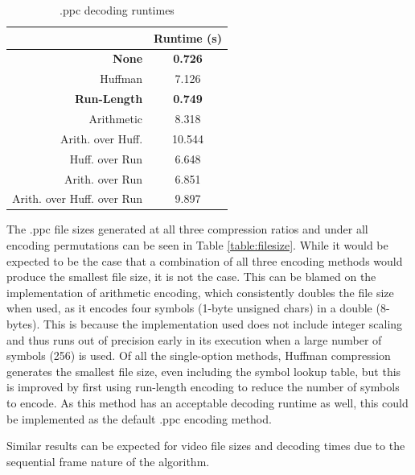 \documentclass[10pt,twocolumn,twoside]{IEEEtran}
\begin{document}
\begin{table}[htdp]
\caption{.ppc decoding runtimes}
\vskip -15pt
\label{table:decode_times}
\small{
\begin{center}
\begin{tabular}{|r|c|}
\hline
 & Runtime (s) \\
 \hline
 \textbf{None} & \textbf{0.726}\\
 \hline
 Huffman & 7.126\\
 \hline
 \textbf{Run-Length} & \textbf{0.749}\\
 \hline
 Arithmetic & 8.318\\
 \hline
 Arith. over Huff. & 10.544\\
 \hline
 Huff. over Run & 6.648\\
 \hline
 Arith. over Run & 6.851\\
 \hline
 Arith. over Huff. over Run & 9.897\\
 \hline
\end{tabular}
\end{center}
}
\end{table}

The .ppc file sizes generated at all three compression ratios and under all encoding permutations can be seen 
in Table \ref{table:filesize}. While it would be expected to be the case that a combination of all three 
encoding methods would produce the smallest file size, it is not the case. This can be blamed on the 
implementation of arithmetic encoding, which consistently doubles the file size when used, as it encodes four 
symbols (1-byte unsigned chars) in a double (8-bytes). This is because the implementation used does not 
include integer scaling and thus runs out of precision early in its execution when a large number of symbols 
(256) is used. Of all the single-option methods, Huffman compression generates the smallest file size, even 
including the symbol lookup table, but this is improved by first using run-length encoding to reduce the 
number of symbols to encode. As this method has an acceptable decoding runtime as well, this could be 
implemented as the default .ppc encoding method.

Similar results can be expected for video file sizes and decoding times due to the sequential frame nature of the algorithm.
\end{document}
